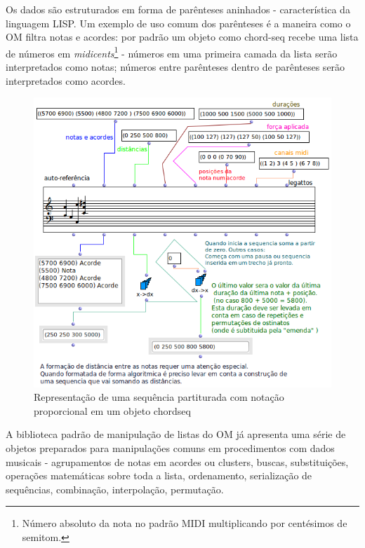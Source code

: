 \documentclass[
	12pt,				%
	openright,			%
	twoside,			%
	a4paper,			%
	english,			%
	french,				%
	spanish,			%
	brazil				%
	]{abntex2}
\begin{document}
Os dados são estruturados em forma de parênteses aninhados - característica da linguagem LISP. Um exemplo de uso comum dos parênteses é a maneira como o OM filtra notas e acordes: por padrão um objeto como chord-seq recebe uma lista de números em \textit{midicents}\footnote{Número absoluto da nota no padrão MIDI multiplicando por centésimos de semitom.} - números em uma primeira camada da lista serão interpretados como notas; números entre parênteses dentro de parênteses serão interpretados como acordes.


\begin{figure}[!h]
	\caption{\label{fig_grafico}Representação de uma sequência partiturada com notação proporcional em um objeto chord\-seq }
	\begin{center}
	    \includegraphics[scale=0.8]{OMPD/chord-seq-sem-titulo.png}
	\end{center}
\end{figure}

A biblioteca padrão de manipulação de listas do OM já apresenta uma série de objetos preparados para manipulações comuns em procedimentos com dados musicais - agrupamentos de notas em acordes ou clusters, buscas, substituições, operações matemáticas sobre toda a lista, ordenamento, serialização  de sequências, combinação, interpolação, permutação. 
\end{document}
